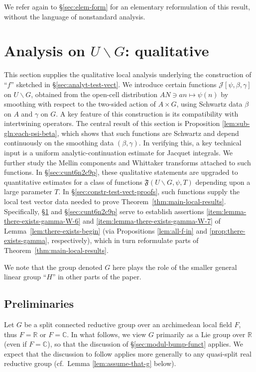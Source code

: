We refer again to \S\ref{sec:elem-form} for an elementary reformulation of this result, without the language of nonstandard analysis.


\section{Analysis on $U \backslash G$: qualitative}\label{sec:some-analysis-basic}

This section supplies the qualitative local analysis underlying the construction of ``$f$'' sketched in \S\ref{sec:analyt-test-vect}.  We introduce certain functions $\mathcal{J}[\psi,\beta,\gamma]$ on $U \backslash G$, obtained from the open-cell distribution $A N \ni a n \mapsto \psi(n)$ by smoothing with respect to the two-sided action of $A \times G$, using Schwartz data $\beta$ on $A$ and $\gamma$ on $G$.  A key feature of this construction is its compatibility with intertwining operators.  The central result of this section is Proposition \ref{lem:sub-gln:each-psi-beta}, which shows that such functions are Schwartz and depend continuously on the smoothing data $(\beta,\gamma)$.  In verifying this, a key technical input is a uniform analytic-continuation estimate for Jacquet integrals.  We further study the Mellin components and Whittaker transforms attached to such functions.  In \S\ref{sec:cunt6n2c9p}, these qualitative statements are upgraded to quantitative estimates for a class of functions $\mathfrak{F}(U \backslash G,\psi,T)$ depending upon a large parameter $T$.  In \S\ref{sec:constr-test-vect-proofs}, such functions supply the local test vector data needed to prove Theorem~\ref{thm:main-local-results}.  Specifically, \S\ref{sec:some-analysis-basic} and \S\ref{sec:cunt6n2c9p} serve to establish assertions \eqref{item:lemma-there-exists-gamma-W-6} and \eqref{item:lemma-there-exists-gamma-W-7} of Lemma~\ref{lem:there-exists-begin} (via Propositions \ref{lem:all-f-in} and \ref{prop:there-exists-gamma}, respectively), which in turn reformulate parts of Theorem~\ref{thm:main-local-results}.

We note that the group denoted $G$ here plays the role of the smaller general linear group ``$H$'' in other parts of the paper.

\subsection{Preliminaries}
Let $G$ be a split connected reductive group over an archimedean local field $F$, thus $F = \mathbb{R}$ or $F = \mathbb{C}$.  In what follows, we view $G$ primarily as a Lie group over $\mathbb{R}$ (even if $F = \mathbb{C}$), so that the discussion of \S\ref{sec:modul-bump-funct} applies.  We expect that the discussion to follow applies more generally to any quasi-split real reductive group (cf.\ Lemma \ref{lem:assume-that-g} below).

